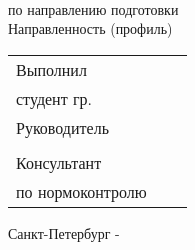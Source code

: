 \vspace{0pt plus2fill} %


{\centering%
	
	\MakeUppercase{\bfseries{}\DocType} \\ 
	\textbf{\MakeUppercase{\thesisDegree}}%


{\centering%
	\MakeUppercase{\bfseries{\thesisTitle}}}%

}\par%

\noindent	по направлению подготовки \thesisSpecialtyCodeAndTitle{}\\%
\noindent	Направленность (профиль)	\thesisOPCodeAndTitle %
\par%





\vspace{4mm plus2fill}%

\noindent
\begin{tabularx}{\linewidth}{lXl}
	Выполнил              &	   &             \\
	студент гр.~\group     &    & \Author     \\[\mfloatsep]

	Руководитель 		  &    &             \\
	\SupervisorJob		  &    & \Supervisor \\[\mfloatsep]
	 	  
	
	Консультант  &    &  \\   	
	по нормоконтролю  		 	  &    & \ConsultantNorm  %
\end{tabularx} %


%
\vspace{0pt plus4fill}%


\begin{center}%
Санкт-Петербург - \thesisYear
\end{center}%
\restoregeometry
\newpage